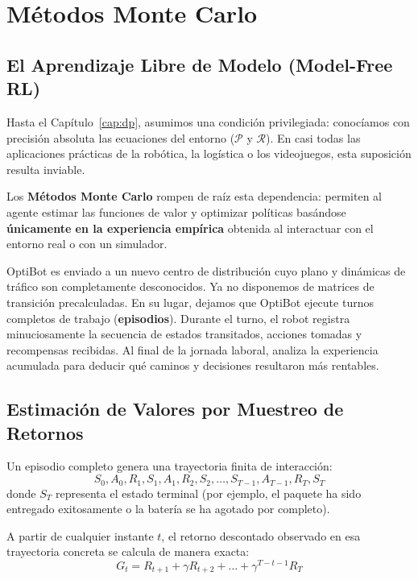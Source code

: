 \chapter{Métodos Monte Carlo}
\label{cap:monte_carlo}

\section{El Aprendizaje Libre de Modelo (Model-Free RL)}
Hasta el Capítulo~\ref{cap:dp}, asumimos una condición privilegiada: conocíamos con precisión absoluta las ecuaciones del entorno ($\mathcal{P}$ y $\mathcal{R}$). En casi todas las aplicaciones prácticas de la robótica, la logística o los videojuegos, esta suposición resulta inviable.

Los \textbf{Métodos Monte Carlo} rompen de raíz esta dependencia: permiten al agente estimar las funciones de valor y optimizar políticas basándose \textbf{únicamente en la experiencia empírica} obtenida al interactuar con el entorno real o con un simulador.

\begin{optibot}
OptiBot es enviado a un nuevo centro de distribución cuyo plano y dinámicas de tráfico son completamente desconocidos. Ya no disponemos de matrices de transición precalculadas. En su lugar, dejamos que OptiBot ejecute turnos completos de trabajo (\textbf{episodios}). Durante el turno, el robot registra minuciosamente la secuencia de estados transitados, acciones tomadas y recompensas recibidas. Al final de la jornada laboral, analiza la experiencia acumulada para deducir qué caminos y decisiones resultaron más rentables.
\end{optibot}

\section{Estimación de Valores por Muestreo de Retornos}
Un episodio completo genera una trayectoria finita de interacción:
\begin{equation}
  S_0, A_0, R_1, S_1, A_1, R_2, S_2, \dots, S_{T-1}, A_{T-1}, R_T, S_T
\end{equation}
donde $S_T$ representa el estado terminal (por ejemplo, el paquete ha sido entregado exitosamente o la batería se ha agotado por completo).

A partir de cualquier instante $t$, el retorno descontado observado en esa trayectoria concreta se calcula de manera exacta:
\begin{equation}
  G_t = R_{t+1} + \gamma R_{t+2} + \dots + \gamma^{T-t-1} R_T
\end{equation}

